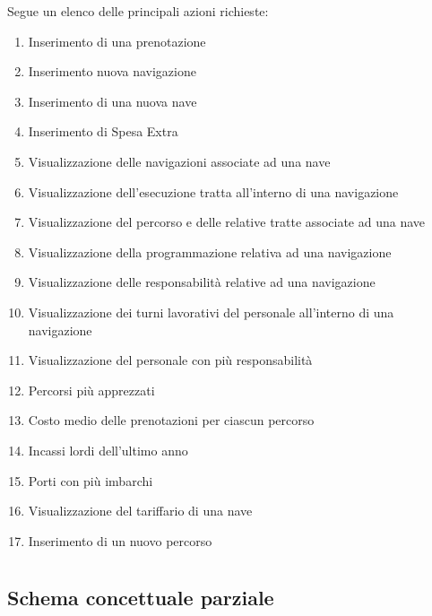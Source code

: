 \documentclass[a4paper, titlepage]{report}
\begin{document}
\noindent
Segue un elenco delle principali azioni richieste:
\begin{enumerate}
    \item Inserimento di una prenotazione
    \item Inserimento nuova navigazione
    \item Inserimento di una nuova nave
    \item Inserimento di Spesa Extra
    \item Visualizzazione delle navigazioni associate ad una nave
    \item Visualizzazione dell'esecuzione tratta all'interno di una navigazione
    \item Visualizzazione del percorso e delle relative tratte associate ad una nave
    \item Visualizzazione della programmazione relativa ad una navigazione
    \item Visualizzazione delle responsabilità relative ad una navigazione
    \item Visualizzazione dei turni lavorativi del personale all'interno di una navigazione
    \item Visualizzazione del personale con più responsabilità
    \item Percorsi più apprezzati
    \item Costo medio delle prenotazioni per ciascun percorso
    \item Incassi lordi dell'ultimo anno
    \item Porti con più imbarchi
    \item Visualizzazione del tariffario di una nave
    \item Inserimento di un nuovo percorso
\end{enumerate}

\newpage
\chapter*{}

	
\section*{Schema concettuale parziale}
\end{document}
